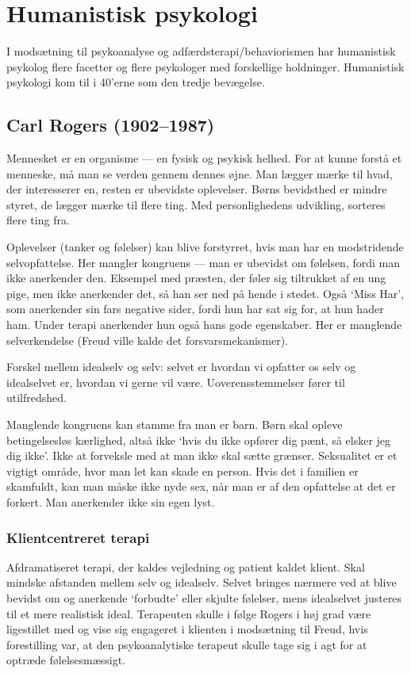 

\section{Humanistisk psykologi}

I modsætning til psykoanalyse og adfærdsterapi/behaviorismen har
humanistisk psykolog flere facetter og flere psykologer med forskellige
holdninger. Humanistisk psykologi kom til i 40'erne som den tredje
bevægelse.

\subsection{Carl Rogers (1902--1987)}

Mennesket er en organisme --- en fysisk og psykisk helhed. For at kunne
forstå et menneske, må man se verden gennem dennes øjne. Man lægger mærke 
til hvad, der interesserer en, resten er ubevidste oplevelser. Børns 
bevidsthed er mindre styret, de lægger mærke til flere ting. Med 
personlighedens udvikling, sorteres flere ting fra.

Oplevelser (tanker og følelser) kan blive forstyrret, hvis man har en 
modstridende selvopfattelse. Her mangler kongruens --- man er ubevidst om 
følelsen, fordi man ikke anerkender den. Eksempel med præsten, der føler 
sig tiltrukket af en ung pige, men ikke anerkender det, så han ser ned på 
hende i stedet. Også `Miss Har', som anerkender sin fars negative sider, 
fordi hun har sat sig for, at hun hader ham. Under terapi anerkender hun 
også hans gode egenskaber. Her er manglende selverkendelse (Freud ville 
kalde det forsvarsmekanismer).

Forskel mellem idealselv og selv: selvet er hvordan vi opfatter os selv 
og idealselvet er, hvordan vi gerne vil være. Uoverensstemmelser fører 
til utilfredshed.

Manglende kongruens kan stamme fra man er barn. Børn skal opleve 
betingelsesløs kærlighed, altså ikke `hvis du ikke opfører dig pænt, 
så elsker jeg dig ikke'. Ikke at forveksle med at man ikke skal sætte 
grænser. Seksualitet er et vigtigt område, hvor man let kan skade en person. 
Hvis det i familien er skamfuldt, kan man måske ikke nyde sex, når man er 
af den opfattelse at det er forkert. Man anerkender ikke sin egen lyst.

\subsubsection{Klientcentreret terapi}

Afdramatiseret terapi, der kaldes vejledning og patient kaldet klient. Skal 
mindske afstanden mellem selv og idealselv. Selvet bringes nærmere ved 
at blive bevidst om og anerkende `forbudte' eller skjulte følelser, mens 
idealselvet justeres til et mere realistisk ideal. Terapeuten skulle i 
følge Rogers i høj grad være ligestillet med og vise sig  engageret 
i klienten i modsætning til Freud, hvis forestilling var, at den 
psykoanalytiske terapeut skulle tage sig i agt for at optræde 
følelsesmæssigt.
